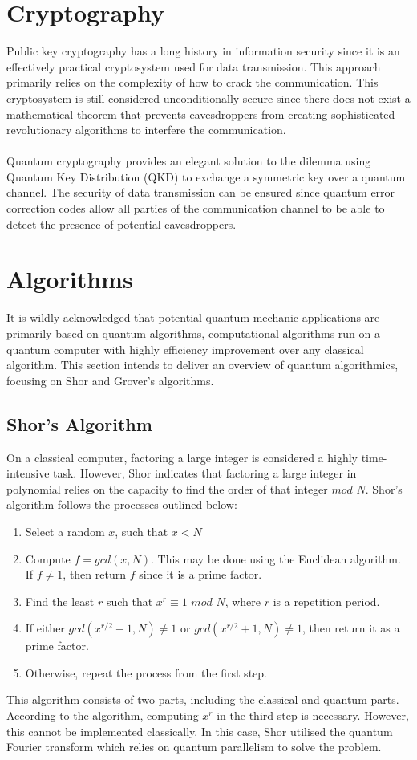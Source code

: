 \documentclass[12pt]{third-rep}
\begin{document}
\section{Cryptography}
Public key cryptography has a long history in information security since it is an effectively practical cryptosystem used for data transmission. This approach primarily relies on the complexity of how to crack the communication. This cryptosystem is still considered unconditionally secure since there does not exist a mathematical theorem that prevents eavesdroppers from creating sophisticated revolutionary algorithms to interfere the communication. \\\\
Quantum cryptography provides an elegant solution to the dilemma using Quantum Key Distribution (QKD) to exchange a symmetric key over a quantum channel. The security of data transmission can be ensured since quantum error correction codes allow all parties of the communication channel to be able to detect the presence of potential eavesdroppers.

\section{Algorithms}
It is wildly acknowledged that potential quantum-mechanic applications are primarily based on quantum algorithms, computational algorithms run on a quantum computer with highly efficiency improvement over any classical algorithm. This section intends to deliver an overview of quantum algorithmics, focusing on Shor and Grover's algorithms.

\subsection{Shor's Algorithm}
On a classical computer, factoring a large integer is considered a highly time-intensive task. However, Shor indicates that factoring a large integer in polynomial relies on the capacity to find the order of that integer $mod$ $N$. Shor's algorithm follows the processes outlined below:
\begin{enumerate}
\item Select a random $x$, such that $x < N$
\item Compute $f = gcd(x,N)$. This may be done using the Euclidean algorithm. If $f\neq1$, then return $f$ since it is a prime factor.
\item Find the least $r$ such that $x^r\equiv1$ $mod$ $N$, where $r$ is a repetition period.
\item If either $gcd(x^{r/2}-1,N)\neq1$ or $gcd(x^{r/2}+1,N)\neq1$, then return it as a prime factor.
\item Otherwise, repeat the process from the first step.
\end{enumerate}
This algorithm consists of two parts, including the classical and quantum parts. According to the algorithm, computing $x^r$ in the third step is necessary. However, this cannot be implemented classically. In this case, Shor utilised the quantum Fourier transform which relies on quantum parallelism to solve the problem.
\end{document}
